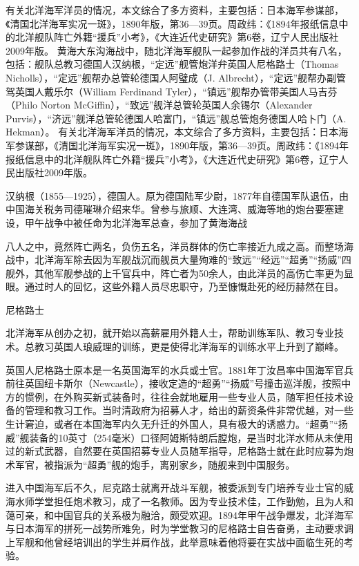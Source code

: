 \documentclass[12pt,UTF8]{ctexbook}
\begin{document}
有关北洋海军洋员的情况，本文综合了多方资料，主要包括：日本海军参谋部，《清国北洋海军实况一斑》，1890年版，第36—39页。周政纬：《1894年报纸信息中的北洋舰队阵亡外籍“援兵”小考》，《大连近代史研究》第6卷，辽宁人民出版社2009年版。
黄海大东沟海战中，随北洋海军舰队一起参加作战的洋员共有八名，包括：舰队总教习德国人汉纳根，“定远”舰管炮洋弁英国人尼格路士（Thomas Nicholls），“定远”舰帮办总管轮德国人阿璧成（J. Albrecht），“定远”舰帮办副管驾英国人戴乐尔（William Ferdinand Tyler），“镇远”舰帮办管带美国人马吉芬（Philo Norton McGiffin），“致远”舰洋总管轮英国人余锡尔（Alexander Purvis），“济远”舰洋总管轮德国人哈富门，“镇远”舰总管炮务德国人哈卜门（A. Hekman）。 有关北洋海军洋员的情况，本文综合了多方资料，主要包括：日本海军参谋部，《清国北洋海军实况一斑》，1890年版，第36—39页。周政纬：《1894年报纸信息中的北洋舰队阵亡外籍“援兵”小考》，《大连近代史研究》第6卷，辽宁人民出版社2009年版。


汉纳根（1855—1925），德国人。原为德国陆军少尉，1877年自德国军队退伍，由中国海关税务司德璀琳介绍来华。曾参与旅顺、大连湾、威海等地的炮台要塞建设，甲午战争中被任命为北洋海军总查，参加了黄海海战

八人之中，竟然阵亡两名，负伤五名，洋员群体的伤亡率接近九成之高。而整场海战中，北洋海军除去因为军舰战沉而舰员大量殉难的“致远”“经远”“超勇”“扬威”四舰外，其他军舰参战的上千官兵中，阵亡者为50余人，由此洋员的高伤亡率更为显眼。通过时人的回忆，这些外籍人员尽忠职守，乃至慷慨赴死的经历赫然在目。

尼格路士

北洋海军从创办之初，就开始以高薪雇用外籍人士，帮助训练军队、教习专业技术。总教习英国人琅威理的训练，更是使得北洋海军的训练水平上升到了巅峰。

英国人尼格路士原本是一名英国海军的水兵或士官。1881年丁汝昌率中国海军官兵前往英国纽卡斯尔（Newcastle），接收定造的“超勇”“扬威”号撞击巡洋舰，按照中方的惯例，在外购买新式装备时，往往会就地雇用一些专业人员，随军担任技术设备的管理和教习工作。当时清政府为招募人才，给出的薪资条件非常优越，对一些生计窘迫，或者在本国海军内久无升迁的外国人，具有极大的诱惑力。“超勇”“扬威”舰装备的10英寸（254毫米）口径阿姆斯特朗后膛炮，是当时北洋水师从未使用过的新式武器，自然要在英国招募专业人员随军指导，尼格路士就在此时应募为炮术军官，被指派为“超勇”舰的炮手，离别家乡，随舰来到中国服务。

进入中国海军后不久，尼克路士就离开战斗军舰，被委派到专门培养专业士官的威海水师学堂担任炮术教习，成了一名教师。因为专业技术佳，工作勤勉，且为人和蔼可亲，和中国官兵的关系极为融洽，颇受欢迎。1894年甲午战争爆发，北洋海军与日本海军的拼死一战势所难免，时为学堂教习的尼格路士自告奋勇，主动要求调上军舰和他曾经培训出的学生并肩作战，此举意味着他将要在实战中面临生死的考验。
\end{document}
